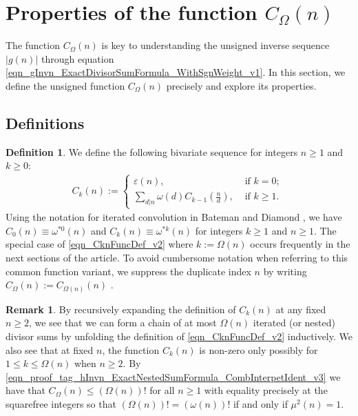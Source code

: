 \documentclass[11pt,reqno,a4letter]{article}
\numberwithin{equation}{section}
\numberwithin{figure}{section}
\numberwithin{table}{section}
\newcommand{\seqnum}[1]{\href{http://oeis.org/#1}{\color{ProcessBlue}{\underline{#1}}}}
\theoremstyle{plain}
\numberwithin{theorem}{section}
\theoremstyle{definition}
\newtheorem{remark}[theorem]{Remark}
\newtheorem{definition}[theorem]{Definition}
\begin{document}
\section{Properties of the function $C_{\Omega}(n)$} 
\label{Section_NewFormulasForgInvn_v1} 

The function $C_{\Omega}(n)$ is key to understanding the 
unsigned inverse sequence $|g(n)|$ through equation 
\eqref{eqn_gInvn_ExactDivisorSumFormula_WithSgnWeight_v1}. 
In this section, we define the unsigned function 
$C_{\Omega}(n)$ precisely and explore its properties. 

\subsection{Definitions}

\begin{definition}
We define the following bivariate sequence for integers $n \geq 1$ and $k \geq 0$: 
\begin{align} 
\label{eqn_CknFuncDef_v2} 
C_k(n) := \begin{cases} 
     \varepsilon(n), & \text{ if $k = 0$; } \\ 
     \sum\limits_{d|n} \omega(d) C_{k-1}\left(\frac{n}{d}\right), & \text{ if $k \geq 1$. } 
     \end{cases} 
\end{align} 
Using the notation for iterated convolution in 
Bateman and Diamond \cite[Def.~ 2.3; \S 2]{ANT-BATEMAN-DIAMOND}, we have 
$C_0(n) \equiv \omega^{\ast 0}(n)$ and $C_k(n) \equiv \omega^{\ast k}(n)$ for 
integers $k \geq 1$ and $n \geq 1$. 
The special case of \eqref{eqn_CknFuncDef_v2} where 
$k := \Omega(n)$ occurs frequently in the next sections of the 
article. To avoid cumbersome notation when referring to this common function variant, we suppress the 
duplicate index $n$ by writing $C_{\Omega}(n) := C_{\Omega(n)}(n)$ \cite[\seqnum{A008480}]{OEIS}. 
\end{definition}

\begin{remark}
By recursively expanding the definition of $C_k(n)$ 
at any fixed $n \geq 2$, we see that 
we can form a chain of at most $\Omega(n)$ iterated (or nested) divisor sums by 
unfolding the definition of \eqref{eqn_CknFuncDef_v2} inductively. 
We also see that at fixed $n$, the function 
$C_k(n)$ is non-zero only possibly for 
$1 \leq k \leq \Omega(n)$ when $n \geq 2$. 
By \eqref{eqn_proof_tag_hInvn_ExactNestedSumFormula_CombInterpetIdent_v3} we have 
that $C_{\Omega}(n) \leq (\Omega(n))!$ for all $n \geq 1$ with 
equality precisely at the squarefree integers so that 
$(\Omega(n))! = (\omega(n))!$ if and only if $\mu^2(n) = 1$. 
\end{remark}
\end{document}
